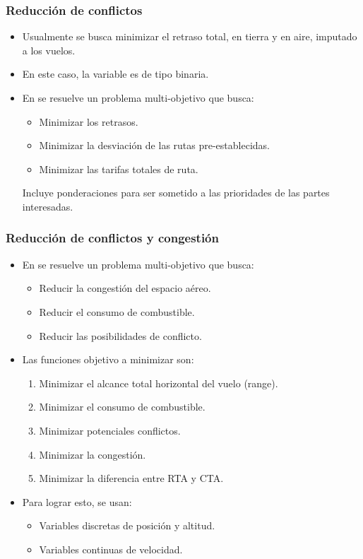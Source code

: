 \begin{frame}
    \frametitle{Reducción de conflictos}
    \begin{itemize}
        \item Usualmente se busca minimizar el retraso total, en tierra y en aire, imputado a los vuelos.
        \item En este caso, la variable es de tipo binaria.
        \item En \cite{DALSASSO2019} se resuelve un problema multi-objetivo que busca:
              \begin{itemize}
                  \item Minimizar los retrasos.
                  \item Minimizar la desviación de las rutas pre-establecidas.
                  \item Minimizar las tarifas totales de ruta.
              \end{itemize}
              Incluye ponderaciones para ser sometido a las prioridades de las partes interesadas.
    \end{itemize}
\end{frame}

\begin{frame}
    \frametitle{Reducción de conflictos y congestión}
    \begin{itemize}\small
        \item En \cite{Zhou_2024} se resuelve un problema multi-objetivo que busca:
              \begin{itemize}
                  \item Reducir la congestión del espacio aéreo.
                  \item Reducir el consumo de combustible.
                  \item Reducir las posibilidades de conflicto.
              \end{itemize}
        \item Las funciones objetivo a minimizar son:
              \begin{enumerate}
                  \item Minimizar el alcance total horizontal del vuelo (range).
                  \item Minimizar el consumo de combustible.
                  \item Minimizar potenciales conflictos.
                  \item Minimizar la congestión.
                  \item Minimizar la diferencia entre RTA y CTA.
              \end{enumerate}
        \item Para lograr esto, se usan:
              \begin{itemize}
                  \item Variables discretas de posición y altitud.
                  \item Variables continuas de velocidad.
              \end{itemize}
    \end{itemize}
\end{frame}

